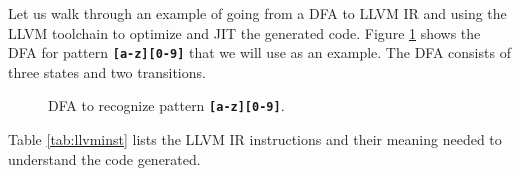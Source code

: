 Let us walk through an example of going from a DFA to LLVM IR and using the LLVM toolchain to optimize and JIT the generated code. Figure \ref{fig:dfacodegenex} shows the DFA for pattern \texttt{\textbf{[a-z][0-9]}} that we will use as an example. The DFA consists of three states and two transitions.

\begin{figure}[H]
\centering
{}
\caption{DFA to recognize pattern \texttt{\textbf{[a-z][0-9]}}.}
\label{fig:dfacodegenex}
\end{figure}

Table \ref{tab:llvminst} lists the LLVM IR instructions and their meaning needed to understand the code generated.

